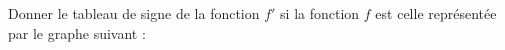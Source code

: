 
\begin{exercice}\label{exosmath-0713}


Donner le tableau de signe de la fonction \( f'\) si la fonction \( f\) est celle représentée par le graphe suivant :
\begin{center}
   
\end{center}

\end{exercice}
